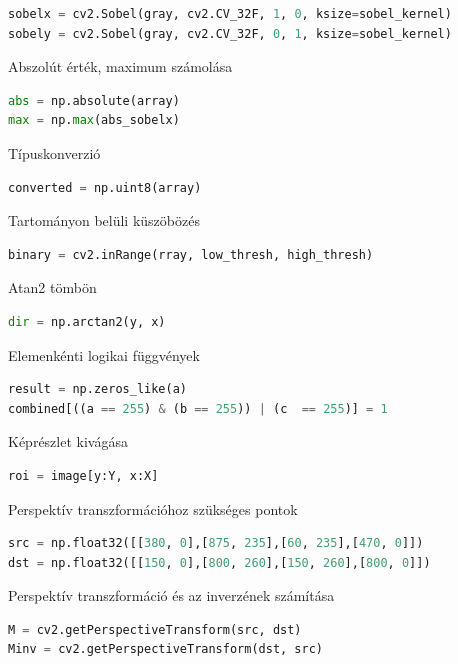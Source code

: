 \documentclass[12pt,a4paper,oneside]{report}             %
\begin{document}
\begin{lstlisting}[language=Python]
sobelx = cv2.Sobel(gray, cv2.CV_32F, 1, 0, ksize=sobel_kernel)
sobely = cv2.Sobel(gray, cv2.CV_32F, 0, 1, ksize=sobel_kernel)
\end{lstlisting}

Abszolút érték, maximum számolása

\begin{lstlisting}[language=Python]
abs = np.absolute(array)
max = np.max(abs_sobelx)
\end{lstlisting}

Típuskonverzió

\begin{lstlisting}[language=Python]
converted = np.uint8(array)
\end{lstlisting}

Tartományon belüli küszöbözés

\begin{lstlisting}[language=Python]
binary = cv2.inRange(rray, low_thresh, high_thresh)
\end{lstlisting}

Atan2 tömbön

\begin{lstlisting}[language=Python]
dir = np.arctan2(y, x)
\end{lstlisting}

Elemenkénti logikai függvények

\begin{lstlisting}[language=Python]
result = np.zeros_like(a)
combined[((a == 255) & (b == 255)) | (c  == 255)] = 1
\end{lstlisting}

Képrészlet kivágása

\begin{lstlisting}[language=Python]
roi = image[y:Y, x:X]
\end{lstlisting}

Perspektív transzformációhoz szükséges pontok

\begin{lstlisting}[language=Python]
src = np.float32([[380, 0],[875, 235],[60, 235],[470, 0]])
dst = np.float32([[150, 0],[800, 260],[150, 260],[800, 0]])
\end{lstlisting}

Perspektív transzformáció és az inverzének számítása

\begin{lstlisting}[language=Python]
M = cv2.getPerspectiveTransform(src, dst)
Minv = cv2.getPerspectiveTransform(dst, src)
\end{lstlisting}
\end{document}
